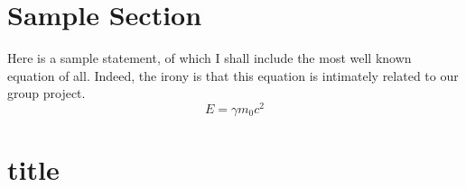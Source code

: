 \documentclass[a4paper]{report}
\begin{document}
\tableofcontents

\section{Sample Section}
Here is a sample statement, of which I shall 
include the most well known equation of all. 
Indeed, the irony is that this equation is 
intimately related to our group project. 
\[ 
E = \gamma m_0 c^2
\]

\section{title}
\end{document}
